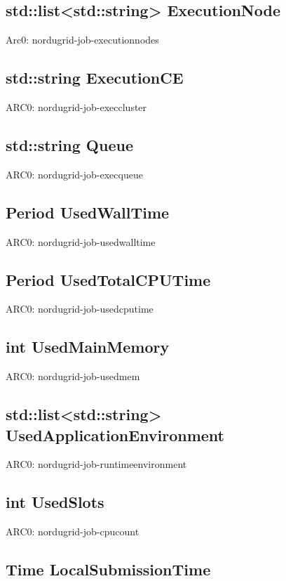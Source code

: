 \documentclass{book}
\begin{document}
\subsection*{std::list<std::string> ExecutionNode}

Arc0: nordugrid-job-executionnodes

\subsection*{std::string ExecutionCE}

ARC0: nordugrid-job-execcluster

\subsection*{std::string Queue}

ARC0: nordugrid-job-execqueue

\subsection*{Period UsedWallTime}

ARC0: nordugrid-job-usedwalltime

\subsection*{Period UsedTotalCPUTime}

ARC0: nordugrid-job-usedcputime

\subsection*{int UsedMainMemory}

ARC0: nordugrid-job-usedmem

\subsection*{std::list<std::string> UsedApplicationEnvironment}

ARC0: nordugrid-job-runtimeenvironment

\subsection*{int UsedSlots}

ARC0: nordugrid-job-cpucount

\subsection*{Time LocalSubmissionTime}
\end{document}

